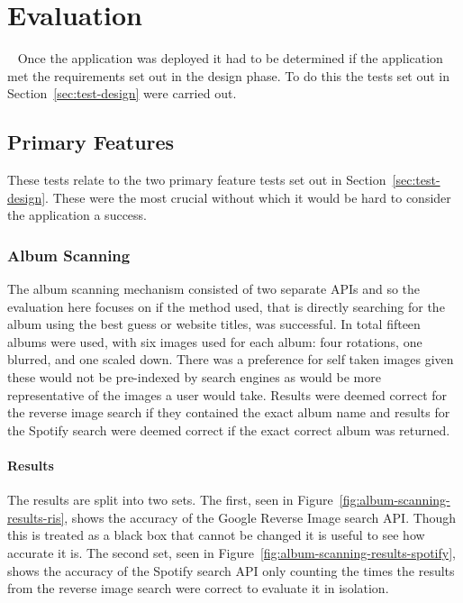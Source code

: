 \chapter{Evaluation}~\label{cha:evaluation}
Once the application was deployed it had to be determined if the application met the requirements set out in the design phase. To do this the tests set out in Section~\ref{sec:test-design} were carried out.

\section{Primary Features}
These tests relate to the two primary feature tests set out in Section~\ref{sec:test-design}. These were the most crucial without which it would be hard to consider the application a success.

\subsection{Album Scanning}
The album scanning mechanism consisted of two separate APIs and so the evaluation here focuses on if the method used, that is directly searching for the album using the best guess or website titles, was successful. In total fifteen albums were used, with six images used for each album: four rotations, one blurred, and one scaled down. There was a preference for self taken images given these would not be pre-indexed by search engines as would be more representative of the images a user would take.
Results were deemed correct for the reverse image search if they contained the exact album name and results for the Spotify search were deemed correct if the exact correct album was returned.

\subsubsection{Results}
The results are split into two sets. The first, seen in Figure~\ref{fig:album-scanning-results-ris}, shows the accuracy of the Google Reverse Image search API. Though this is treated as a black box that cannot be changed it is useful to see how accurate it is. The second set, seen in Figure~\ref{fig:album-scanning-results-spotify}, shows the accuracy of the Spotify search API only counting the times the results from the reverse image search were correct to evaluate it in isolation.

